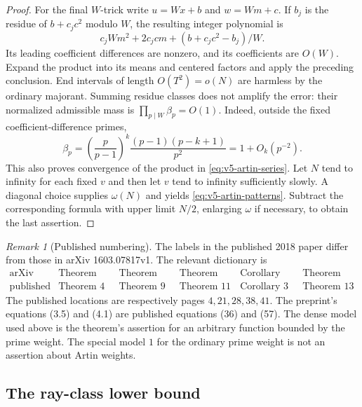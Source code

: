 \documentclass[11pt]{article}
\theoremstyle{definition}
\theoremstyle{remark}
\newtheorem{remark}[theorem]{Remark}
\begin{document}
\begin{proof}
For the final $W$-trick write $u=Wx+b$ and $w=Wm+c$.
If $b_j$ is the residue of $b+c_jc^2$ modulo $W$, the resulting integer
polynomial is
\[
 c_jWm^2+2c_jcm+(b+c_jc^2-b_j)/W.
\]
Its leading coefficient differences are nonzero, and its coefficients
are $O(W)$. Expand the product into its means and centered factors and
apply the preceding conclusion. End intervals of length $O(T^2)=o(N)$
are harmless by the ordinary majorant. Summing residue classes does not
amplify the error: their normalized admissible mass is
$\prod_{p\mid W}\beta_p=O(1)$.
Indeed, outside the fixed coefficient-difference primes,
\[
 \beta_p=\left(\frac p{p-1}\right)^k
                \frac{(p-1)(p-k+1)}{p^2}=1+O_k(p^{-2}).
\]
This also proves convergence of the product in
\eqref{eq:v5-artin-series}.
Let $N$ tend to infinity for each fixed $v$ and then let $v$ tend to
infinity sufficiently slowly. A diagonal choice supplies $\omega(N)$
and yields \eqref{eq:v5-artin-patterns}. Subtract the corresponding
formula with upper limit $N/2$, enlarging $\omega$ if necessary, to
obtain the last assertion.
\end{proof}

\begin{remark}[Published numbering]\label{rem:v5-tz-numbering}
The labels in the published 2018 paper differ from those in arXiv
1603.07817v1. The relevant dictionary is
\[
\begin{array}{c|ccccc}
 \text{arXiv} &\text{Theorem 1.4}&\text{Theorem 2.5}&\text{Theorem 3.1}
               &\text{Corollary 3.9}&\text{Theorem 4.1}\\
 \text{published}&\text{Theorem 4}&\text{Theorem 9}&\text{Theorem 11}
               &\text{Corollary 3}&\text{Theorem 13}
\end{array}
\]
The published locations are respectively pages $4,21,28,38,41$.
The preprint's equations (3.5) and (4.1) are published equations (36)
and (57). The dense model used above is the theorem's assertion for an
arbitrary function bounded by the prime weight. The special model $1$
for the ordinary prime weight is not an assertion about Artin weights.
\end{remark}

\subsection{The ray-class lower bound}\label{subsec:v5-ray-density}
\end{document}
